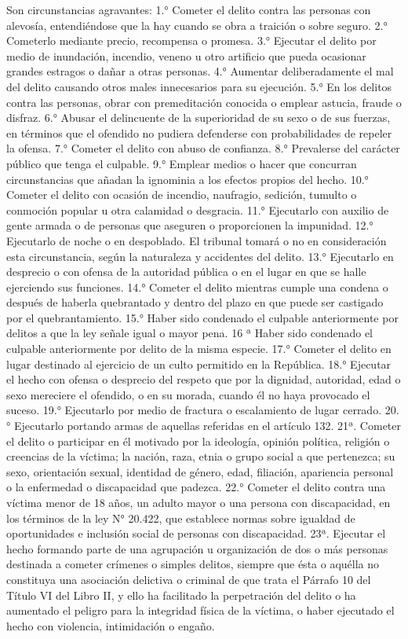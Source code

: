     Son circunstancias agravantes:
    1.° Cometer el delito contra las personas con alevosía, entendiéndose que la hay cuando se obra a traición o sobre seguro.
    2.° Cometerlo mediante precio, recompensa o promesa.
    3.° Ejecutar el delito por medio de inundación, incendio, veneno u otro artificio que pueda ocasionar grandes estragos o dañar a otras personas.
    4.° Aumentar deliberadamente el mal del delito causando otros males innecesarios para su ejecución.
    5.° En los delitos contra las personas, obrar con premeditación conocida o emplear astucia, fraude o disfraz.
    6.° Abusar el delincuente de la superioridad de su sexo o de sus fuerzas, en términos que el ofendido no pudiera defenderse con probabilidades de repeler la ofensa.
    7.° Cometer el delito con abuso de confianza.
    8.° Prevalerse del carácter público que tenga el culpable.
    9.° Emplear medios o hacer que concurran circunstancias que añadan la ignominia a los efectos propios del hecho.
    10.° Cometer el delito con ocasión de incendio, naufragio, sedición, tumulto o conmoción popular u otra calamidad o desgracia.
    11.° Ejecutarlo con auxilio de gente armada o de personas que aseguren o proporcionen la impunidad.
    12.° Ejecutarlo de noche o en despoblado.
    El tribunal tomará o no en consideración esta circunstancia, según la naturaleza y accidentes del delito.
    13.° Ejecutarlo en desprecio o con ofensa de la autoridad pública o en el lugar en que se halle ejerciendo sus funciones.
    14.° Cometer el delito mientras cumple una condena o después de haberla quebrantado y dentro del plazo en que puede ser castigado por el quebrantamiento.
    15.° Haber sido condenado el culpable anteriormente por delitos a que la ley señale igual o mayor pena.
    16 ª Haber sido condenado el culpable anteriormente por delito de la misma especie.
    17.° Cometer el delito en lugar destinado al ejercicio de un culto permitido en la República.
    18.° Ejecutar el hecho con ofensa o desprecio del respeto que por la dignidad, autoridad, edad o sexo mereciere el ofendido, o en su morada, cuando él no haya provocado el suceso.
    19.° Ejecutarlo por medio de fractura o escalamiento de lugar cerrado.
    20.° Ejecutarlo portando armas de aquellas referidas en el artículo 132.
    21ª. Cometer el delito o participar en él motivado por la ideología, opinión política, religión o creencias de la víctima; la nación, raza, etnia o grupo social a que pertenezca; su sexo, orientación sexual, identidad de género, edad, filiación, apariencia personal o la enfermedad o discapacidad que padezca.
    22.° Cometer el delito contra una víctima menor de 18 años, un adulto mayor o una persona con discapacidad, en los términos de la ley N° 20.422, que establece normas sobre igualdad de oportunidades e inclusión social de personas con discapacidad.
    23ª. Ejecutar el hecho formando parte de una agrupación u organización de dos o más personas destinada a cometer crímenes o simples delitos, siempre que ésta o aquélla no constituya una asociación delictiva o criminal de que trata el Párrafo 10 del Título VI del Libro II, y ello ha facilitado la perpetración del delito o ha aumentado el peligro para la integridad física de la víctima, o haber ejecutado el hecho con violencia, intimidación o engaño.


